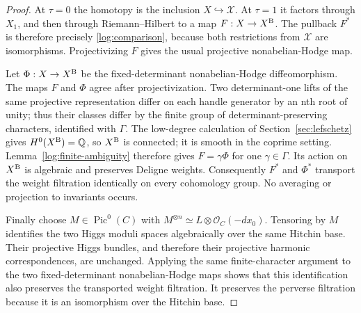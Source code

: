 \begin{proof}
At $\tau=0$ the homotopy is the inclusion $X\hookrightarrow\mathcal X$.
At $\tau=1$ it factors through $X_1$, and then through
Riemann--Hilbert to a map $F:X\to X^{\rm B}$.
The pullback $F^*$ is therefore precisely
\eqref{log:comparison}, because both restrictions from
$\mathcal X$ are isomorphisms.  Projectivizing $F$ gives the
usual projective nonabelian-Hodge map.

Let $\Phi:X\to X^{\rm B}$ be the fixed-determinant
nonabelian-Hodge diffeomorphism.  The maps $F$ and $\Phi$ agree
after projectivization.  Two determinant-one lifts of the same
projective representation differ on each handle generator by an
nth root of unity; thus their classes differ by the finite group
of determinant-preserving characters, identified with $\Gamma$.
The low-degree calculation of Section~\ref{sec:lefschetz} gives
$H^0(X^{\rm B})=\mathbb Q$, so $X^{\rm B}$ is connected; it is
smooth in the coprime setting.  Lemma~\ref{log:finite-ambiguity}
therefore gives $F=\gamma\Phi$ for one $\gamma\in\Gamma$.
Its action on $X^{\rm B}$ is algebraic and preserves Deligne
weights.  Consequently $F^*$ and $\Phi^*$ transport the weight
filtration identically on every cohomology group.  No averaging
or projection to invariants occurs.

Finally choose $M\in\operatorname{Pic}^0(C)$ with
$M^{\otimes n}\simeq L\otimes\mathcal O_C(-d x_0)$.
Tensoring by $M$ identifies the two Higgs moduli spaces
algebraically over the same Hitchin base.  Their projective
Higgs bundles, and therefore their projective harmonic
correspondences, are unchanged.  Applying the same finite-character
argument to the two fixed-determinant nonabelian-Hodge maps shows
that this identification also preserves the transported weight
filtration.  It preserves the perverse filtration because it is
an isomorphism over the Hitchin base.
\end{proof}
